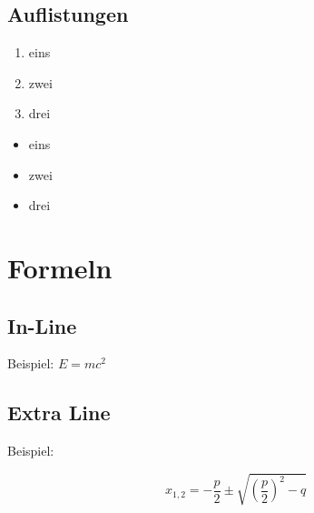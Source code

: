 	\subsection{Auflistungen}
	\begin{frame}{\subsecname}

		\begin{minipage}[t]{0.5\textwidth}
			\par\medskip
			\begin{enumerate}
				\item eins
				\item zwei
				\item drei
			\end{enumerate}
		\end{minipage}%
		\begin{minipage}[t]{0.5\textwidth}
			\par\medskip
			\begin{itemize}
				\item eins
				\item zwei
				\item drei
			\end{itemize}
		\end{minipage}

	\end{frame}
	
\section{Formeln}

	\subsection{In-Line}
	\begin{frame}{\subsecname}

		Beispiel: \( E = mc^2 \)
	
	\end{frame}
	
	\subsection{Extra Line}
	\begin{frame}{\subsecname}

		Beispiel:

		\begin{equation*}
			x_{1,2} = -\frac{p}{2} \pm \sqrt{ \left( \frac{p}{2} \right)^2 - q }
		\end{equation*}

	\end{frame}

